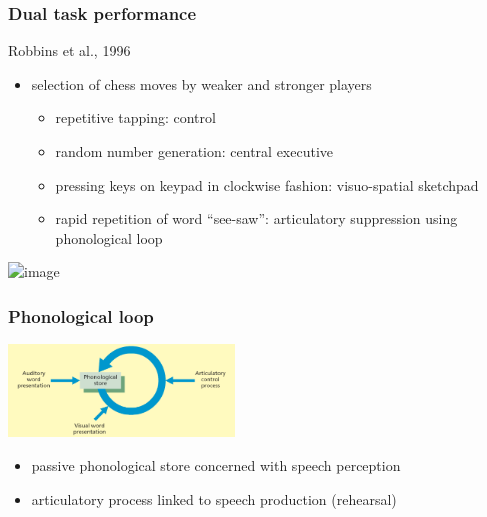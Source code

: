\documentclass[]{beamer}
\begin{document}
\begin{frame}
 \frametitle{Dual task performance}
\begin{overlayarea}{110mm}{80mm}
Robbins et al., 1996
\begin{itemize}
 \item selection of chess moves by weaker and stronger players
 \begin{itemize}
  \item repetitive tapping: control
  \item random number generation: central executive
  \item pressing keys on keypad in clockwise fashion: visuo-spatial sketchpad
  \item rapid repetition of word ``see-saw'': articulatory suppression using phonological loop

 \end{itemize}
\end{itemize}

 \begin{center}
\includegraphics<2->[width=60mm]{figs/l10/chess_robbins96.png}
 \end{center}
\end{overlayarea}
\end{frame}


\begin{frame}
 \frametitle{Phonological loop}
\begin{overlayarea}{110mm}{80mm}
 \begin{center}
\includegraphics[width=60mm]{figs/l10/phonological_loop.png}
 \end{center}

\begin{itemize}
 \item passive phonological store concerned with speech perception
 \item articulatory process linked to speech production (rehearsal)
\end{itemize}

\end{overlayarea}
\end{frame}
\end{document}
